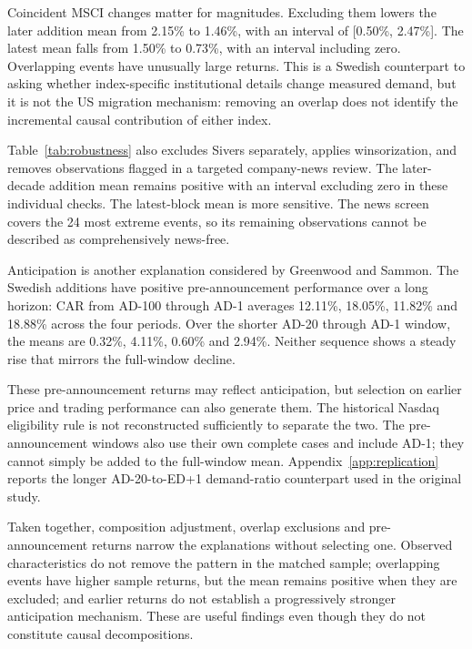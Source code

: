 Coincident MSCI changes matter for magnitudes. Excluding them lowers the later addition mean from 2.15\% to 1.46\%, with an interval of [0.50\%, 2.47\%]. The latest mean falls from 1.50\% to 0.73\%, with an interval including zero. Overlapping events have unusually large returns. This is a Swedish counterpart to asking whether index-specific institutional details change measured demand, but it is not the US migration mechanism: removing an overlap does not identify the incremental causal contribution of either index.

Table~\ref{tab:robustness} also excludes Sivers separately, applies winsorization, and removes observations flagged in a targeted company-news review. The later-decade addition mean remains positive with an interval excluding zero in these individual checks. The latest-block mean is more sensitive. The news screen covers the 24 most extreme events, so its remaining observations cannot be described as comprehensively news-free.



Anticipation is another explanation considered by Greenwood and Sammon. The Swedish additions have positive pre-announcement performance over a long horizon: CAR from AD-100 through AD-1 averages 12.11\%, 18.05\%, 11.82\% and 18.88\% across the four periods. Over the shorter AD-20 through AD-1 window, the means are 0.32\%, 4.11\%, 0.60\% and 2.94\%. Neither sequence shows a steady rise that mirrors the full-window decline.



These pre-announcement returns may reflect anticipation, but selection on earlier price and trading performance can also generate them. The historical Nasdaq eligibility rule is not reconstructed sufficiently to separate the two. The pre-announcement windows also use their own complete cases and include AD-1; they cannot simply be added to the full-window mean. Appendix~\ref{app:replication} reports the longer AD-20-to-ED+1 demand-ratio counterpart used in the original study.

Taken together, composition adjustment, overlap exclusions and pre-announcement returns narrow the explanations without selecting one. Observed characteristics do not remove the pattern in the matched sample; overlapping events have higher sample returns, but the mean remains positive when they are excluded; and earlier returns do not establish a progressively stronger anticipation mechanism. These are useful findings even though they do not constitute causal decompositions.

